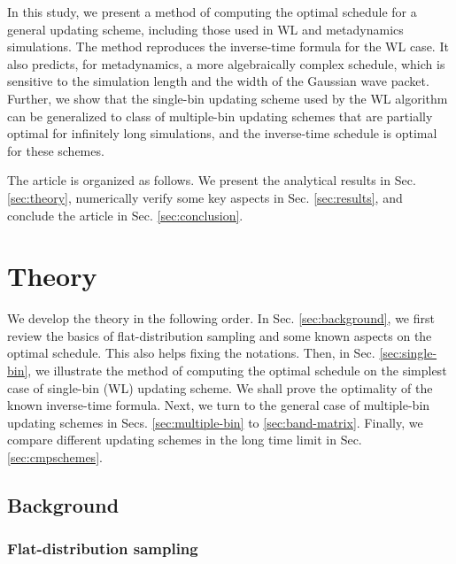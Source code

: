 \documentclass[reprint, floatfix]{revtex4-1}
\begin{document}
In this study,
we present a method of computing
the optimal schedule
for a general updating scheme,
including those used in WL and metadynamics simulations.
%
The method reproduces the inverse-time formula
for the WL case.
%
It also predicts, for metadynamics,
a more algebraically complex schedule,
which is sensitive to the simulation length
and the width of the Gaussian wave packet.
%
Further, we show that
the single-bin updating scheme
used by the WL algorithm
can be generalized to class of multiple-bin updating schemes
that are partially optimal for infinitely long simulations,
and the inverse-time schedule is optimal for these schemes.
%



The article is organized as follows.
%
We present the analytical results in Sec. \ref{sec:theory},
numerically verify some key aspects
in Sec. \ref{sec:results},
and conclude the article
in Sec. \ref{sec:conclusion}.




\section{\label{sec:theory}
Theory}



We develop the theory
in the following order.
%
In Sec. \ref{sec:background},
we first review the basics of
flat-distribution sampling
and some known aspects on the optimal schedule.
%
This also helps fixing the notations.
%
Then, in Sec. \ref{sec:single-bin},
we illustrate the method of
computing the optimal schedule
on the simplest case of
single-bin (WL) updating scheme.
%
We shall prove the optimality
of the known inverse-time formula.
%
Next, we turn to the general case
of multiple-bin updating schemes
in Secs. \ref{sec:multiple-bin}
to \ref{sec:band-matrix}.
%
Finally, we compare different updating schemes
in the long time limit
in Sec. \ref{sec:cmpschemes}.



\subsection{\label{sec:background}
Background}



\subsubsection{\label{sec:FDS}
Flat-distribution sampling}
\end{document}
